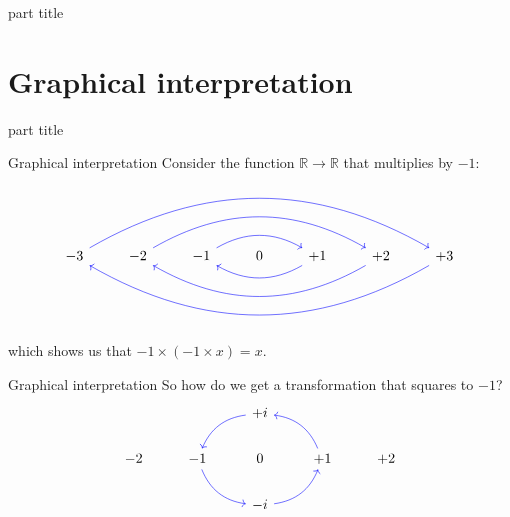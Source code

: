 \documentclass{beamer}
\begin{document}
\begin{frame}
\begin{beamercolorbox}[sep=12pt,center]{part title}
\insertsection\par
\end{beamercolorbox}
\end{frame}


\section{Graphical interpretation}

\begin{frame}
\begin{beamercolorbox}[sep=12pt,center]{part title}
\insertsection\par
\end{beamercolorbox}
\end{frame}





\begin{frame}[fragile]{Graphical interpretation}
Consider the function $\mathbb{R} \rightarrow \mathbb{R}$ that multiplies by $-1$:
\begin{equation*}
\begin{tikzcd}
-3\arrow[bend left, color = blue]{rrrrrr} & -2\arrow[bend left, color = blue]{rrrr} & -1 \arrow[bend left, color = blue]{rr} & 0 & +1\arrow[bend left, color = blue]{ll} & +2\arrow[bend left, color = blue]{llll} & +3\arrow[bend left, color = blue]{llllll}\\
\end{tikzcd}
\end{equation*}
which shows us that $-1\times(-1\times x) = x$.
\end{frame}

\begin{frame}[fragile]{Graphical interpretation}
So how do we get a transformation that squares to $-1$?
\begin{equation*}
\begin{tikzcd}
{} & {} & +i \arrow[bend right, color = blue]{dl} & {} & {}\\
-2 & -1\arrow[bend right, color = blue]{dr} & 0 & +1 \arrow[bend right, color = blue]{ul} & +2\\
{} & {} & -i\arrow[bend right, color = blue]{ur} & {} & {}
\end{tikzcd}
\end{equation*}
\end{frame}
\end{document}
